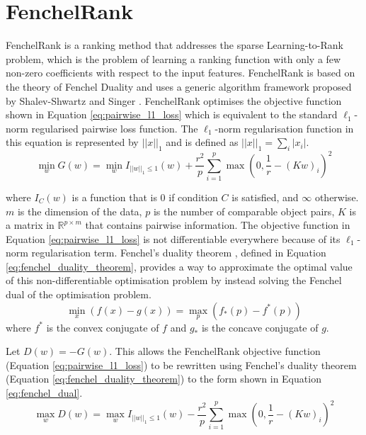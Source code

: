 \section{FenchelRank}
FenchelRank \cite{Lai2013} is a ranking method that addresses the sparse Learning-to-Rank problem, which is the problem of learning a ranking function with only a few non-zero coefficients with respect to the input features. FenchelRank is based on the theory of Fenchel Duality \cite{Rifkin2007} and uses a generic algorithm framework proposed by Shalev-Shwartz and Singer \cite{Shalev-Shwartz2010}. FenchelRank optimises the objective function shown in Equation \ref{eq:pairwise_l1_loss} which is equivalent to the standard $\ell_1$-norm regularised pairwise loss function. The $\ell_1$-norm regularisation function in this equation is represented by $||x||_1$ and is defined as $||x||_1=\sum\nolimits_i|x_i|$.
\begin{equation}
\min_w G(w) = \min_w I_{||w||_{1} \le 1}(w) + \frac{r^2}{p} \sum\limits_{i=1}^{p}\max(0,\frac{1}{r}-(Kw)_i)^2
\label{eq:pairwise_l1_loss}
\end{equation}

\noindent where $I_{C}(w)$ is a function that is 0 if condition $C$ is satisfied, and $\infty$ otherwise. $m$ is the dimension of the data, $p$ is the number of comparable object pairs, $K$ is a matrix in $\mathbb{R}^{p \times m}$ that contains pairwise information. The objective function in Equation \ref{eq:pairwise_l1_loss} is not differentiable everywhere because of its $\ell_1$-norm regularisation term. Fenchel's duality theorem \cite{Rifkin2007}, defined in Equation \ref{eq:fenchel_duality_theorem}, provides a way to approximate the optimal value of this non-differentiable optimisation problem by instead solving the Fenchel dual of the optimisation problem.
\begin{equation}
\min_x(f(x)-g(x)) = \max_p(f_*(p)-f^*(p))
\label{eq:fenchel_duality_theorem}
\end{equation}
\noindent where $f^*$ is the convex conjugate of $f$ and $g_*$ is the concave conjugate of $g$.

\noindent Let $D(w) = -G(w)$. This allows the FenchelRank objective function (Equation \ref{eq:pairwise_l1_loss}) to be rewritten using Fenchel's duality theorem (Equation \ref{eq:fenchel_duality_theorem}) to the form shown in Equation \ref{eq:fenchel_dual}.
\begin{equation}
\max_w D(w) = \max_w I_{||w||_{1} \le 1}(w) - \frac{r^2}{p} \sum\limits_{i=1}^{p}\max(0,\frac{1}{r}-(Kw)_i)^2
\label{eq:fenchel_dual}
\end{equation}

